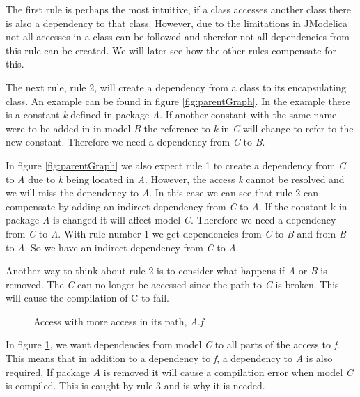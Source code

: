 \documentclass{cslthse-msc}
\begin{document}
The first rule is perhaps the most intuitive, if a class accesses another class there is also a dependency to that class. However, due to the limitations in JModelica not all accesses in a class can be followed and therefor not all dependencies from this rule can be created. We will later see how the other rules compensate for this. 

The next rule, rule 2, will create a dependency from a class to its encapsulating class. An example can be found in figure \ref{fig:parentGraph}. In the example there is a constant \textit{k} defined in package \textit{A}. If another constant with the same name were to be added in in model \textit{B} the reference to \textit{k} in \textit{C} will change to refer to the new constant. Therefore we need a dependency from \textit{C} to \textit{B}.

In figure \ref{fig:parentGraph} we also expect rule 1 to create a dependency from \textit{C} to \textit{A} due to \textit{k} being located in \textit{A}. However, the access \textit{k} cannot be resolved and we will miss the dependency to \textit{A}. In this case we can see that rule 2 can compensate by adding an indirect dependency from \textit{C} to \textit{A}. 
If the constant k in package \textit{A} is changed it will affect model \textit{C}. Therefore we need a dependency from \textit{C} to \textit{A}. With rule number 1 we get dependencies from \textit{C} to \textit{B} and from \textit{B} to \textit{A}. So we have an indirect dependency from \textit{C} to \textit{A}.

Another way to think about rule 2 is to consider what happens if \textit{A} or \textit{B} is removed. The \textit{C} can no longer be accessed since the path to \textit{C} is broken. This will cause the compilation of C to fail.

\begin{figure}[!htbp]
    \centering
    \qquad
    \caption{Access with more access in its path, \textit{A.f}}
    \label{fig:dotAccess}
\end{figure}

In figure \ref{fig:dotAccess}, we want dependencies from model \textit{C} to all parts of the access to \textit{f}. This means that in addition to a dependency to \textit{f}, a dependency to \textit{A} is also required. If package \textit{A} is removed it will cause a compilation error when model \textit{C} is compiled. This is caught by rule 3 and is why it is needed.
\end{document}
